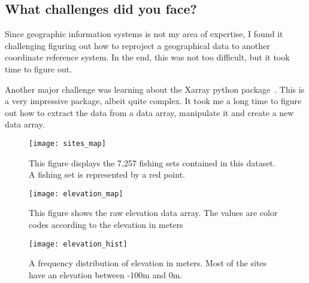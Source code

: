 \subsection{What challenges did you face?}

Since geographic information systems is not my area of expertise, I found it challenging figuring out how to reproject a geographical data to another
coordinate reference system.
In the end, this was not too difficult, but it took time to figure out.

Another major challenge was learning about the Xarray python package~\cite{xarray}.
This is a very impressive package, albeit quite complex.
It took me a long time to figure out how to extract the data from a data array, manipulate it and create a new data array.


\begin{figure}
    \texttt{[image: sites\_map]}
    \caption{This figure displays the 7,257 fishing sets contained in this dataset. A fishing set is represented by a red point.}
    \label{fig:set_map}
\end{figure}


\begin{figure}
    \texttt{[image: elevation\_map]}
    \caption{This figure shows the raw elevation data array. The values are color codes according to the elevation in meters}
    \label{fig:elevation_map}
\end{figure}

\begin{figure}
    \texttt{[image: elevation\_hist]}
    \caption{A frequency distribution of elevation in meters. Most of the sites have an elevation between -100m and 0m.}
    \label{fig:elevation_hist}
\end{figure}

